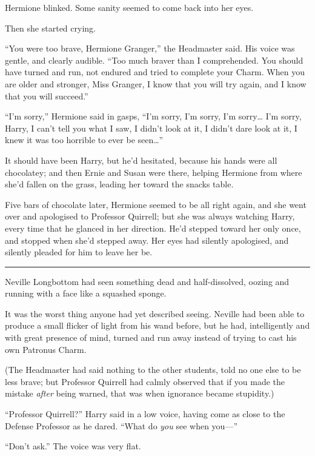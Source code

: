 Hermione blinked. Some sanity seemed to come back into her eyes.

Then she started crying.

``You were too brave, Hermione Granger,'' the Headmaster said. His voice
was gentle, and clearly audible. ``Too much braver than I comprehended.
You should have turned and run, not endured and tried to complete your
Charm. When you are older and stronger, Miss Granger, I know that you
will try again, and I know that you will succeed.''

``I'm sorry,'' Hermione said in gasps, ``I'm sorry, I'm sorry, I'm
sorry\ldots{} I'm sorry, Harry, I can't tell you what I saw, I didn't
look at it, I didn't dare look at it, I knew it was too horrible to ever
be seen\ldots{}''

It should have been Harry, but he'd hesitated, because his hands were
all chocolatey; and then Ernie and Susan were there, helping Hermione
from where she'd fallen on the grass, leading her toward the snacks
table.

Five bars of chocolate later, Hermione seemed to be all right again, and
she went over and apologised to Professor Quirrell; but she was always
watching Harry, every time that he glanced in her direction. He'd
stepped toward her only once, and stopped when she'd stepped away. Her
eyes had silently apologised, and silently pleaded for him to leave her
be.

\begin{center}\rule{3in}{0.4pt}\end{center}

Neville Longbottom had seen something dead and half-dissolved, oozing
and running with a face like a squashed sponge.

It was the worst thing anyone had yet described seeing. Neville had been
able to produce a small flicker of light from his wand before, but he
had, intelligently and with great presence of mind, turned and run away
instead of trying to cast his own Patronus Charm.

(The Headmaster had said nothing to the other students, told no one else
to be less brave; but Professor Quirrell had calmly observed that if you
made the mistake \emph{after} being warned, that was when ignorance
became stupidity.)

``Professor Quirrell?'' Harry said in a low voice, having come as close
to the Defense Professor as he dared. ``What do \emph{you} see when
you---''

``Don't ask.'' The voice was very flat.

